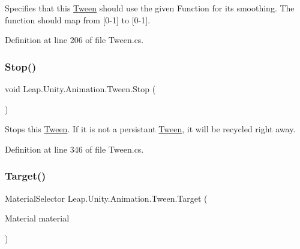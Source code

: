 Specifies that this \mbox{\hyperlink{struct_leap_1_1_unity_1_1_animation_1_1_tween}{Tween}} should use the given Function for its smoothing. The function should map from \mbox{[}0-\/1\mbox{]} to \mbox{[}0-\/1\mbox{]}. 



Definition at line 206 of file Tween.\+cs.

\mbox{\label{struct_leap_1_1_unity_1_1_animation_1_1_tween_ad5f8092aec0bf5f7f301b9dbeef5a666}} 
\subsubsection{\texorpdfstring{Stop()}{Stop()}}
{\footnotesize\ttfamily void Leap.\+Unity.\+Animation.\+Tween.\+Stop (\begin{DoxyParamCaption}{ }\end{DoxyParamCaption})}



Stops this \mbox{\hyperlink{struct_leap_1_1_unity_1_1_animation_1_1_tween}{Tween}}. If it is not a persistant \mbox{\hyperlink{struct_leap_1_1_unity_1_1_animation_1_1_tween}{Tween}}, it will be recycled right away. 



Definition at line 346 of file Tween.\+cs.

\mbox{\label{struct_leap_1_1_unity_1_1_animation_1_1_tween_ace36e93470c4b1168289ae1eef2e4736}} 
\subsubsection{\texorpdfstring{Target()}{Target()}\hspace{0.1cm}{\footnotesize\ttfamily [1/2]}}
{\footnotesize\ttfamily Material\+Selector Leap.\+Unity.\+Animation.\+Tween.\+Target (\begin{DoxyParamCaption}\item[{Material}]{material }\end{DoxyParamCaption})}



